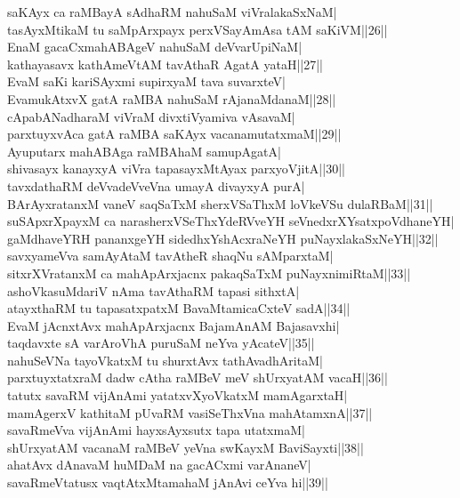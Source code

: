 \documentclass{article}
\begin{document}
saKAyx ca raMBayA sAdhaRM nahuSaM viVralakaSxNaM|\\
tasAyxMtikaM tu saMpArxpayx perxVSayAmAsa tAM saKiVM||26||\\
EnaM gacaCxmahABAgeV nahuSaM deVvarUpiNaM|\\
kathayasavx kathAmeVtAM tavAthaR AgatA yataH||27||\\
EvaM saKi kariSAyxmi supirxyaM tava suvarxteV|\\
EvamukAtxvX gatA raMBA nahuSaM rAjanaMdanaM||28||\\
cApabANadharaM viVraM divxtiVyamiva vAsavaM|\\
parxtuyxvAca gatA raMBA saKAyx vacanamutatxmaM||29||\\
Ayuputarx mahABAga raMBAhaM samupAgatA|\\
shivasayx kanayxyA viVra tapasayxMtAyax parxyoVjitA||30||\\
tavxdathaRM deVvadeVveVna umayA divayxyA purA|\\
BArAyxratanxM vaneV saqSaTxM sherxVSaThxM loVkeVSu dulaRBaM||31||\\
suSApxrXpayxM ca narasherxVSeThxYdeRVveYH seVnedxrXYsatxpoVdhaneYH|\\
gaMdhaveYRH pananxgeYH sidedhxYshAcxraNeYH puNayxlakaSxNeYH||32||\\
savxyameVva samAyAtaM tavAtheR shaqNu sAMparxtaM|\\
sitxrXVratanxM ca mahApArxjacnx pakaqSaTxM puNayxnimiRtaM||33||\\
ashoVkasuMdariV nAma tavAthaRM tapasi sithxtA|\\
atayxthaRM tu tapasatxpatxM BavaMtamicaCxteV sadA||34||\\
EvaM jAcnxtAvx mahApArxjacnx BajamAnAM Bajasavxhi|\\
taqdavxte sA varAroVhA puruSaM neYva yAcateV||35||\\
nahuSeVNa tayoVkatxM tu shurxtAvx tathAvadhAritaM|\\
parxtuyxtatxraM dadw cAtha raMBeV meV shUrxyatAM vacaH||36||\\
tatutx savaRM vijAnAmi yatatxvXyoVkatxM mamAgarxtaH|\\
mamAgerxV kathitaM pUvaRM vasiSeThxVna mahAtamxnA||37||\\
savaRmeVva vijAnAmi hayxsAyxsutx tapa utatxmaM|\\
shUrxyatAM vacanaM raMBeV yeVna swKayxM BaviSayxti||38||\\
ahatAvx dAnavaM huMDaM na gacACxmi varAnaneV|\\
savaRmeVtatusx vaqtAtxMtamahaM jAnAvi ceYva hi||39||\\
\end{document}
